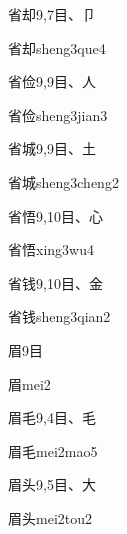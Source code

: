 \begin{entry}{省却}{9,7}{⽬、⼙}
  \begin{phonetics}{省却}{sheng3que4}
  \end{phonetics}
\end{entry}

\begin{entry}{省俭}{9,9}{⽬、⼈}
  \begin{phonetics}{省俭}{sheng3jian3}
  \end{phonetics}
\end{entry}

\begin{entry}{省城}{9,9}{⽬、⼟}
  \begin{phonetics}{省城}{sheng3cheng2}
  \end{phonetics}
\end{entry}

\begin{entry}{省悟}{9,10}{⽬、⼼}
  \begin{phonetics}{省悟}{xing3wu4}
  \end{phonetics}
\end{entry}

\begin{entry}{省钱}{9,10}{⽬、⾦}
  \begin{phonetics}{省钱}{sheng3qian2}
  \end{phonetics}
\end{entry}

\begin{entry}{眉}{9}{⽬}
  \begin{phonetics}{眉}{mei2}
  \end{phonetics}
\end{entry}

\begin{entry}{眉毛}{9,4}{⽬、⽑}
  \begin{phonetics}{眉毛}{mei2mao5}
  \end{phonetics}
\end{entry}

\begin{entry}{眉头}{9,5}{⽬、⼤}
  \begin{phonetics}{眉头}{mei2tou2}
  \end{phonetics}
\end{entry}

